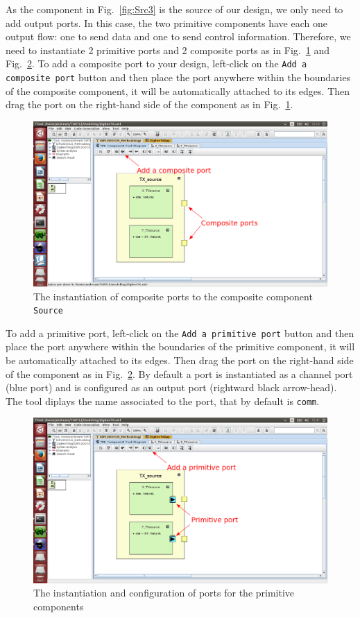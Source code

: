 \documentclass{llncs}
\newcommand{\screenshotsize}{1.0\textwidth}
\begin{document}
As the component in Fig.~\ref{fig:Src3} is the source of our design, we only need to add output ports. In this case, the
two primitive components have each one output flow: one to send data and one to send control information. Therefore, we
need to instantiate 2 primitive ports and 2 composite ports as in Fig.~\ref{fig:Ports1} and Fig.~\ref{fig:Ports2}. To
add a composite port to your design, left-click on the \texttt{Add a composite port} button and then place the port
anywhere within the boundaries of the composite component, it will be automatically attached to its edges. Then drag the
port on the right-hand side of the component as in Fig.~\ref{fig:Ports1}.
%
\begin{figure}[!htbp]
	\centering
	\includegraphics[width=\screenshotsize]{figures/screenshot/Ports1.png}
	\caption{The instantiation of composite ports to the composite component \texttt{Source}}
	\label{fig:Ports1}
\end{figure}
%
To add a primitive port, left-click on the \texttt{Add a primitive port} button and then place the port anywhere within
the boundaries of the primitive component, it will be automatically attached to its edges. Then drag the port on the
right-hand side of the component as in Fig.~\ref{fig:Ports2}. By default a port is instantiated as a channel port (blue
port) and is configured as an output port (rightward black arrow-head). The tool diplays the name associated to the port,
that by default is \texttt{comm}.
%
\begin{figure}[!htbp]
	\centering
	\includegraphics[width=\screenshotsize]{figures/screenshot/Ports2.png}
	\caption{The instantiation and configuration of ports for the primitive components}
	\label{fig:Ports2}
\end{figure}
\end{document}
